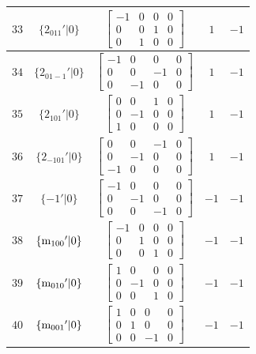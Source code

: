 \documentclass[fleqn,8pt]{jsarticle}
\begin{document}
\begin{longtable}{ccccc}
$ 33 $ & $ \{2{}_{011}{}'|0\} $ & $ \begin{bmatrix} -1 & 0 & 0 & 0 \\ 0 & 0 & 1 & 0 \\ 0 & 1 & 0 & 0 \end{bmatrix} $ & $ 1 $ & $ -1 $ \\ \hline
$ 34 $ & $ \{2{}_{01-1}{}'|0\} $ & $ \begin{bmatrix} -1 & 0 & 0 & 0 \\ 0 & 0 & -1 & 0 \\ 0 & -1 & 0 & 0 \end{bmatrix} $ & $ 1 $ & $ -1 $ \\ \hline
$ 35 $ & $ \{2{}_{101}{}'|0\} $ & $ \begin{bmatrix} 0 & 0 & 1 & 0 \\ 0 & -1 & 0 & 0 \\ 1 & 0 & 0 & 0 \end{bmatrix} $ & $ 1 $ & $ -1 $ \\ \hline
$ 36 $ & $ \{2{}_{-101}{}'|0\} $ & $ \begin{bmatrix} 0 & 0 & -1 & 0 \\ 0 & -1 & 0 & 0 \\ -1 & 0 & 0 & 0 \end{bmatrix} $ & $ 1 $ & $ -1 $ \\ \hline
$ 37 $ & $ \{-1{}'|0\} $ & $ \begin{bmatrix} -1 & 0 & 0 & 0 \\ 0 & -1 & 0 & 0 \\ 0 & 0 & -1 & 0 \end{bmatrix} $ & $ -1 $ & $ -1 $ \\ \hline
$ 38 $ & $ \{{\rm m}_{100}{}'|0\} $ & $ \begin{bmatrix} -1 & 0 & 0 & 0 \\ 0 & 1 & 0 & 0 \\ 0 & 0 & 1 & 0 \end{bmatrix} $ & $ -1 $ & $ -1 $ \\ \hline
$ 39 $ & $ \{{\rm m}_{010}{}'|0\} $ & $ \begin{bmatrix} 1 & 0 & 0 & 0 \\ 0 & -1 & 0 & 0 \\ 0 & 0 & 1 & 0 \end{bmatrix} $ & $ -1 $ & $ -1 $ \\ \hline
$ 40 $ & $ \{{\rm m}_{001}{}'|0\} $ & $ \begin{bmatrix} 1 & 0 & 0 & 0 \\ 0 & 1 & 0 & 0 \\ 0 & 0 & -1 & 0 \end{bmatrix} $ & $ -1 $ & $ -1 $ \\ \hline

\end{longtable}
\end{document}
